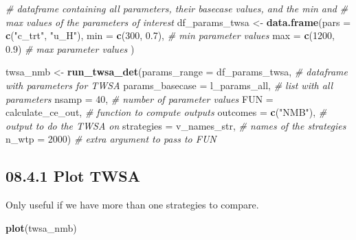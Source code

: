 \documentclass[]{article}
\newenvironment{Shaded}{\begin{snugshade}}{\end{snugshade}}
\newcommand{\KeywordTok}[1]{\textcolor[rgb]{0.13,0.29,0.53}{\textbf{#1}}}
\newcommand{\DataTypeTok}[1]{\textcolor[rgb]{0.13,0.29,0.53}{#1}}
\newcommand{\DecValTok}[1]{\textcolor[rgb]{0.00,0.00,0.81}{#1}}
\newcommand{\FloatTok}[1]{\textcolor[rgb]{0.00,0.00,0.81}{#1}}
\newcommand{\StringTok}[1]{\textcolor[rgb]{0.31,0.60,0.02}{#1}}
\newcommand{\CommentTok}[1]{\textcolor[rgb]{0.56,0.35,0.01}{\textit{#1}}}
\newcommand{\NormalTok}[1]{#1}
\begin{document}
\begin{Shaded}
\begin{Highlighting}[]
\CommentTok{# dataframe containing all parameters, their basecase values, and the min and }
\CommentTok{# max values of the parameters of interest}
\NormalTok{df_params_twsa <-}\StringTok{ }\KeywordTok{data.frame}\NormalTok{(}\DataTypeTok{pars =} \KeywordTok{c}\NormalTok{(}\StringTok{"c_trt"}\NormalTok{, }\StringTok{"u_H"}\NormalTok{),}
                             \DataTypeTok{min  =} \KeywordTok{c}\NormalTok{(}\DecValTok{300}\NormalTok{, }\FloatTok{0.7}\NormalTok{),  }\CommentTok{# min parameter values}
                             \DataTypeTok{max  =} \KeywordTok{c}\NormalTok{(}\DecValTok{1200}\NormalTok{, }\FloatTok{0.9}\NormalTok{)  }\CommentTok{# max parameter values}
\NormalTok{                             )}

\NormalTok{twsa_nmb <-}\StringTok{ }\KeywordTok{run_twsa_det}\NormalTok{(}\DataTypeTok{params_range    =}\NormalTok{ df_params_twsa,    }\CommentTok{# dataframe with parameters for TWSA}
                         \DataTypeTok{params_basecase =}\NormalTok{ l_params_all,      }\CommentTok{# list with all parameters}
                         \DataTypeTok{nsamp           =} \DecValTok{40}\NormalTok{,                }\CommentTok{# number of parameter values}
                         \DataTypeTok{FUN             =}\NormalTok{ calculate_ce_out,  }\CommentTok{# function to compute outputs}
                         \DataTypeTok{outcomes        =} \KeywordTok{c}\NormalTok{(}\StringTok{"NMB"}\NormalTok{),          }\CommentTok{# output to do the TWSA on}
                         \DataTypeTok{strategies      =}\NormalTok{ v_names_str,       }\CommentTok{# names of the strategies}
                         \DataTypeTok{n_wtp           =} \DecValTok{2000}\NormalTok{)              }\CommentTok{# extra argument to pass to FUN}
\end{Highlighting}
\end{Shaded}

\subsection{08.4.1 Plot TWSA}\label{plot-twsa}

Only useful if we have more than one strategies to compare.

\begin{Shaded}
\begin{Highlighting}[]
\KeywordTok{plot}\NormalTok{(twsa_nmb)}
\end{Highlighting}
\end{Shaded}
\end{document}
